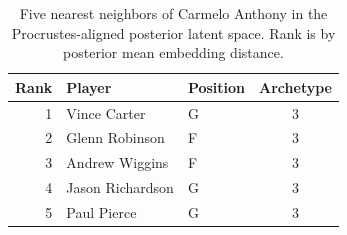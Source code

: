 \begin{table}[htbp]
  \centering\small
  \begin{tabular}{rllc}
    \toprule
    Rank & Player & Position & Archetype \\
    \midrule
    1 & Vince Carter & G & 3 \\
    2 & Glenn Robinson & F & 3 \\
    3 & Andrew Wiggins & F & 3 \\
    4 & Jason Richardson & G & 3 \\
    5 & Paul Pierce & G & 3 \\
    \bottomrule
  \end{tabular}
  \caption{Five nearest neighbors of Carmelo Anthony in the Procrustes-aligned posterior latent space. Rank is by posterior mean embedding distance.}
  \label{tab:Carmelo_Anthony_neighbors}
\end{table}

